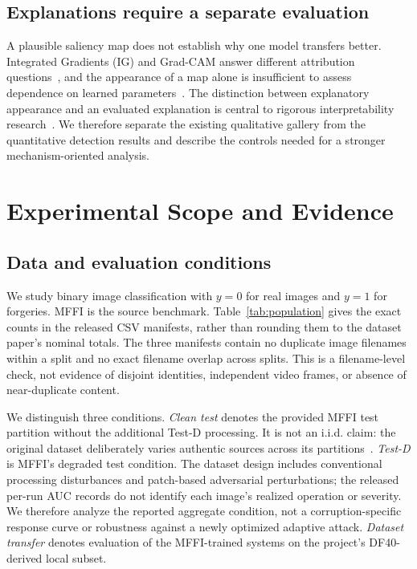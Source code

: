 \documentclass[conference,10pt,letterpaper]{IEEEtran}
\begin{document}
\subsection{Explanations require a separate evaluation}
A plausible saliency map does not establish why one model transfers better. Integrated Gradients (IG) and Grad-CAM answer different attribution questions~\cite{sundararajan2017,selvaraju2017}, and the appearance of a map alone is insufficient to assess dependence on learned parameters~\cite{adebayo2018}. The distinction between explanatory appearance and an evaluated explanation is central to rigorous interpretability research~\cite{doshi2017}. We therefore separate the existing qualitative gallery from the quantitative detection results and describe the controls needed for a stronger mechanism-oriented analysis.

\section{Experimental Scope and Evidence}
\subsection{Data and evaluation conditions}
\label{sec:data}
We study binary image classification with $y=0$ for real images and $y=1$ for forgeries. MFFI is the source benchmark. Table~\ref{tab:population} gives the exact counts in the released CSV manifests, rather than rounding them to the dataset paper's nominal totals. The three manifests contain no duplicate image filenames within a split and no exact filename overlap across splits. This is a filename-level check, not evidence of disjoint identities, independent video frames, or absence of near-duplicate content.

\begin{table}[t]
\caption{Exact MFFI manifest counts in the pinned release. Counts describe the manifests, not independently verified image-level coverage for every historical run.}
\label{tab:population}
\centering
\small

\end{table}

We distinguish three conditions. \emph{Clean test} denotes the provided MFFI test partition without the additional Test-D processing. It is not an i.i.d. claim: the original dataset deliberately varies authentic sources across its partitions~\cite{miao2025}. \emph{Test-D} is MFFI's degraded test condition. The dataset design includes conventional processing disturbances and patch-based adversarial perturbations; the released per-run AUC records do not identify each image's realized operation or severity. We therefore analyze the reported aggregate condition, not a corruption-specific response curve or robustness against a newly optimized adaptive attack. \emph{Dataset transfer} denotes evaluation of the MFFI-trained systems on the project's DF40-derived local subset.
\end{document}
